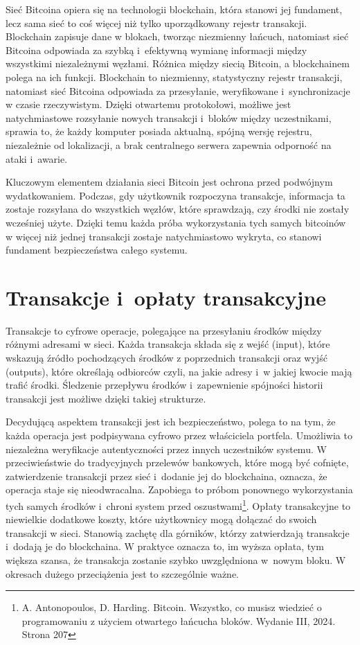\documentclass[12pt,a4paper]{report}
\theoremstyle{definition} %
\begin{document}
	Sieć Bitcoina opiera się na technologii blockchain, która stanowi jej fundament, lecz sama sieć to coś więcej niż tylko uporządkowany rejestr transakcji. Blockchain zapisuje dane w blokach, tworząc niezmienny łańcuch, natomiast sieć Bitcoina odpowiada za szybką i~efektywną wymianę informacji między wszystkimi niezależnymi węzłami. Różnica między 		siecią Bitcoin, a blockchainem polega na ich funkcji. Blockchain to niezmienny, statystyczny rejestr transakcji, natomiast sieć Bitcoina odpowiada za przesyłanie, weryfikowane i~synchronizacje w czasie rzeczywistym. Dzięki otwartemu protokołowi, możliwe jest natychmiastowe rozsyłanie nowych transakcji i~bloków między uczestnikami, 					sprawia to, że każdy komputer posiada aktualną, spójną wersję rejestru, niezależnie od lokalizacji, a brak centralnego serwera zapewnia odporność na ataki i~awarie.

	Kluczowym elementem działania sieci Bitcoin jest ochrona przed podwójnym wydatkowaniem. Podczas, gdy użytkownik rozpoczyna transakcje, informacja ta zostaje rozsyłana do wszystkich węzłów, które sprawdzają, czy środki nie zostały wcześniej użyte. Dzięki temu każda próba wykorzystania tych samych bitcoinów w więcej niż jednej transakcji 			zostaje natychmiastowo wykryta, co stanowi fundament bezpieczeństwa całego systemu.
	\section{Transakcje i~opłaty transakcyjne}
	\hspace*{\parindent} Transakcje to cyfrowe operacje, polegające na przesyłaniu środków między różnymi adresami w sieci. Każda transakcja składa się z wejść (input), które wskazują źródło pochodzących środków z poprzednich transakcji oraz wyjść (outputs), które określają odbiorców czyli, na jakie adresy i~w jakiej kwocie mają trafić środki. Śledzenie 			przepływu środków i~zapewnienie spójności historii transakcji jest możliwe dzięki takiej strukturze.

	Decydującą aspektem transakcji jest ich bezpieczeństwo, polega to na tym, że każda operacja jest podpisywana cyfrowo przez właściciela portfela. Umożliwia to niezależna weryfikacje autentyczności przez innych uczestników systemu. W przeciwieństwie do tradycyjnych przelewów bankowych, które mogą być cofnięte, zatwierdzenie transakcji przez sieć  	i~dodanie jej do blockchaina, oznacza, że operacja staje się nieodwracalna. Zapobiega to próbom ponownego wykorzystania tych samych środków i~chroni system przed oszustwami\footnote{A. Antonopoulos, D. Harding. Bitcoin. Wszystko, co musisz wiedzieć o programowaniu z użyciem otwartego łańcucha bloków. Wydanie III, 2024. Strona 207}.
	Opłaty transakcyjne to niewielkie dodatkowe koszty, które użytkownicy mogą dołączać do swoich transakcji w sieci. Stanowią zachętę dla górników, którzy zatwierdzają transakcje i~dodają je do blockchaina. W praktyce oznacza to, im wyższa opłata, tym większa szansa, że transakcja zostanie szybko uwzględniona w~nowym bloku. W okresach dużego przeciążenia jest to szczególnie ważne.
\end{document}
